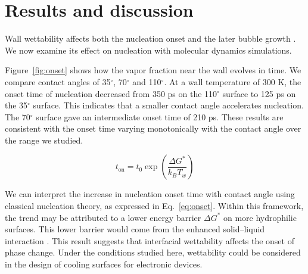 \section{Results and discussion}\label{sec:results}

Wall wettability affects both the nucleation onset and the later bubble growth \cite{kim2015,chen2019}. We now examine its effect on nucleation with molecular dynamics simulations.

Figure~\ref{fig:onset} shows how the vapor fraction near the wall evolves in time. We compare contact angles of 35$^\circ$, 70$^\circ$ and 110$^\circ$. At a wall temperature of 300 K, the onset time of nucleation decreased from 350 ps on the 110$^\circ$ surface to 125 ps on the 35$^\circ$ surface. This indicates that a smaller contact angle accelerates nucleation. The 70$^\circ$ surface gave an intermediate onset time of 210 ps. These results are consistent with the onset time varying monotonically with the contact angle over the range we studied.

\begin{equation}
  t_{\mathrm{on}} = t_0 \exp\left(\frac{\Delta G^*}{k_B T_w}\right)
  \label{eq:onset}
\end{equation}

We can interpret the increase in nucleation onset time with contact angle using classical nucleation theory, as expressed in Eq.~\eqref{eq:onset}. Within this framework, the trend may be attributed to a lower energy barrier $\Delta G^*$ on more hydrophilic surfaces. This lower barrier would come from the enhanced solid--liquid interaction \cite{carey2018}. This result suggests that interfacial wettability affects the onset of phase change. Under the conditions studied here, wettability could be considered in the design of cooling surfaces for electronic devices.
